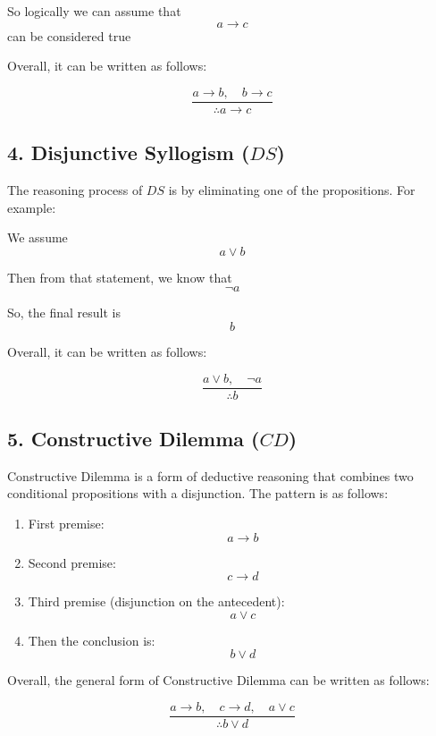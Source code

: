 So logically we can assume that \[a \rightarrow c\] can be considered
true

Overall, it can be written as follows:

\[\frac{a \rightarrow b, \quad b \rightarrow c}{\therefore a \rightarrow c}\]

\subsection{\texorpdfstring{4. Disjunctive Syllogism
(\(DS\))}{4. Disjunctive Syllogism (DS)}}\label{disjunctive-syllogism-ds}

The reasoning process of \(DS\) is by eliminating one of the
propositions. For example:

We assume \[a \lor b\]

Then from that statement, we know that \[\neg a\]

So, the final result is \[b\]

Overall, it can be written as follows:

\[\frac{a \lor b, \quad \neg a}{\therefore b}\]

\subsection{\texorpdfstring{5. Constructive Dilemma
(\(CD\))}{5. Constructive Dilemma (CD)}}\label{constructive-dilemma-cd}

Constructive Dilemma is a form of deductive reasoning that combines two
conditional propositions with a disjunction. The pattern is as follows:

\begin{enumerate}
\def\labelenumi{\arabic{enumi}.}
\item
  First premise:\\
  \[a \rightarrow b\]
\item
  Second premise:\\
  \[c \rightarrow d\]
\item
  Third premise (disjunction on the antecedent):\\
  \[a \lor c\]
\item
  Then the conclusion is:\\
  \[b \lor d\]
\end{enumerate}

Overall, the general form of Constructive Dilemma can be written as
follows:

\[
\frac{a \rightarrow b, \quad c \rightarrow d, \quad a \lor c}{\therefore b \lor d}
\]

